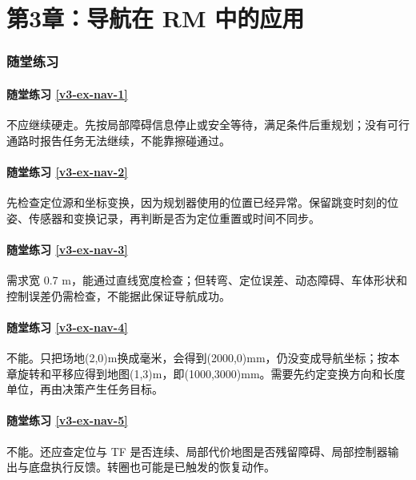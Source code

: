 \section*{第3章：导航在 RM 中的应用}
{}
\subsubsection*{随堂练习}
\paragraph*{随堂练习 \ref{v3-ex-nav-1}}
\begin{solution}
不应继续硬走。先按局部障碍信息停止或安全等待，满足条件后重规划；没有可行通路时报告任务无法继续，不能靠擦碰通过。
\end{solution}

\paragraph*{随堂练习 \ref{v3-ex-nav-2}}
\begin{solution}
先检查定位源和坐标变换，因为规划器使用的位置已经异常。保留跳变时刻的位姿、传感器和变换记录，再判断是否为定位重置或时间不同步。
\end{solution}

\paragraph*{随堂练习 \ref{v3-ex-nav-3}}
\begin{solution}
需求宽 0.7 m，能通过直线宽度检查；但转弯、定位误差、动态障碍、车体形状和控制误差仍需检查，不能据此保证导航成功。
\end{solution}

\paragraph*{随堂练习 \ref{v3-ex-nav-4}}
\begin{solution}
不能。只把场地(2,0)m换成毫米，会得到(2000,0)mm，仍没变成导航坐标；按本章旋转和平移应得到地图(1,3)m，即(1000,3000)mm。需要先约定变换方向和长度单位，再由决策产生任务目标。
\end{solution}

\paragraph*{随堂练习 \ref{v3-ex-nav-5}}
\begin{solution}
不能。还应查定位与 TF 是否连续、局部代价地图是否残留障碍、局部控制器输出与底盘执行反馈。转圈也可能是已触发的恢复动作。
\end{solution}

